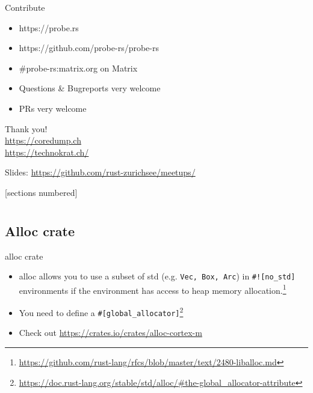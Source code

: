 \documentclass[aspectratio=1610,14pt,t]{beamer}
\begin{document}
\begin{frame}[c]{Contribute}
  \begin{itemize}
    \item https://probe.rs
    \item https://github.com/probe-rs/probe-rs
    \item \#probe-rs:matrix.org on Matrix
    \item Questions \& Bugreports very welcome
    \item PRs very welcome
  \end{itemize}
\end{frame}


{
\begin{frame}[standout]
  \begin{centering}
    {\Huge Thank you!}\\
    {\normalsize \url{https://coredump.ch}}\\
    {\normalsize \url{https://technokrat.ch/}}\\
  \end{centering}
  {\small Slides: \url{https://github.com/rust-zurichsee/meetups/}}\\
  \vspace{3cm}
\end{frame}
}


[sections numbered]
\appendix
\section{\appendixname}
\frame{\tableofcontents}
\subsection{Alloc crate}

\begin{frame}[c]{alloc crate}
  \begin{itemize}
    \item alloc allows you to use a subset of std (e.g. \texttt{Vec, Box, Arc})
      in \texttt{\#![no\_std]} environments if the environment has access to
      heap memory allocation.\footnote{\url{https://github.com/rust-lang/rfcs/blob/master/text/2480-liballoc.md}}
    \item You need to define a \texttt{\#[global\_allocator]}\footnote{\url{https://doc.rust-lang.org/stable/std/alloc/\#the-global\_allocator-attribute}}
    \item Check out \url{https://crates.io/crates/alloc-cortex-m}
  \end{itemize}
\end{frame}
\end{document}
